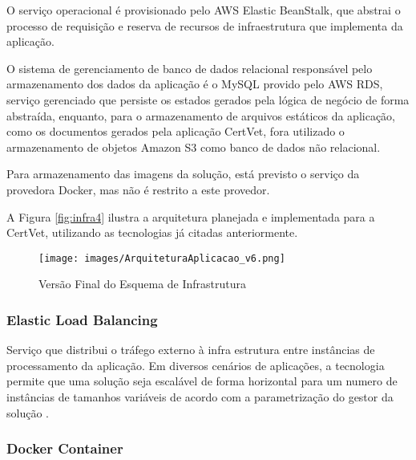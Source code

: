\documentclass[
    12pt,               %
    openright,          %
    oneside,
    a4paper,            %
    BIBLATEX,           %
    TODO,               %
    english,            %
    brazil              %
    ]{ifsp-spo-inf-ctds}
\providecommand{\DIFaddbeginFL}{} %
\providecommand{\DIFaddendFL}{} %
\providecommand{\DIFdelbeginFL}{} %
\providecommand{\DIFdelendFL}{} %
\newcommand{\DIFscaledelfig}{0.5}
\newlength{\DIFdelgraphicswidth} %
\newlength{\DIFdelgraphicsheight} %
\newcommand{\DIFaddincludegraphics}[2][]{{\color{blue}\fbox{\DIFOincludegraphics[#1]{#2}}}} %
\newcommand{\DIFdelincludegraphics}[2][]{%
\sbox{\DIFdelgraphicsbox}{\DIFOincludegraphics[#1]{#2}}%
\settoboxwidth{\DIFdelgraphicswidth}{\DIFdelgraphicsbox} %
\settoboxtotalheight{\DIFdelgraphicsheight}{\DIFdelgraphicsbox} %
\scalebox{\DIFscaledelfig}{%
\parbox[b]{\DIFdelgraphicswidth}{\usebox{\DIFdelgraphicsbox}\\[-\baselineskip] \rule{\DIFdelgraphicswidth}{0em}}\llap{\resizebox{\DIFdelgraphicswidth}{\DIFdelgraphicsheight}{%
\setlength{\unitlength}{\DIFdelgraphicswidth}%
\begin{picture}(1,1)%
\thicklines\linethickness{2pt} %
{\color[rgb]{1,0,0}\put(0,0){\framebox(1,1){}}}%
{\color[rgb]{1,0,0}\put(0,0){\line( 1,1){1}}}%
{\color[rgb]{1,0,0}\put(0,1){\line(1,-1){1}}}%
\end{picture}%
}\hspace*{3pt}}} %
} %
\DeclareRobustCommand{\DIFaddbeginFL}{\DIFOaddbeginFL \let\includegraphics\DIFaddincludegraphics} %
\DeclareRobustCommand{\DIFaddendFL}{\DIFOaddendFL \let\includegraphics\DIFOincludegraphics} %
\DeclareRobustCommand{\DIFdelbeginFL}{\DIFOdelbeginFL \let\includegraphics\DIFdelincludegraphics} %
\DeclareRobustCommand{\DIFdelendFL}{\DIFOaddendFL \let\includegraphics\DIFOincludegraphics} %
\begin{document}
        O serviço operacional é provisionado pelo AWS Elastic BeanStalk, que abstrai o processo de requisição e reserva de recursos de infraestrutura que implementa da aplicação.

        O sistema de gerenciamento de banco de dados relacional responsável pelo armazenamento dos dados da aplicação é o MySQL provido pelo AWS RDS, serviço gerenciado que persiste os estados gerados pela lógica de negócio de forma abstraída, enquanto, para o armazenamento de arquivos estáticos da aplicação, como os documentos gerados pela aplicação CertVet, fora utilizado o armazenamento de objetos Amazon S3 como banco de dados não relacional.

        Para armazenamento das imagens da solução, está previsto o serviço da provedora Docker, mas não é restrito a este provedor.

        A Figura \ref{fig:infra4} ilustra a arquitetura planejada e implementada para a CertVet, utilizando as tecnologias já citadas anteriormente.


        \begin{figure}[H]
                \centering
                \caption{Versão Final do Esquema de Infrastrutura}
                \centering
                \DIFdelbeginFL %
\DIFdelendFL \DIFaddbeginFL \texttt{[image: images/ArquiteturaAplicacao\_v6.png]}
                \label{fig:infra3}
        \DIFaddendFL \end{figure}

        \subsubsection{Elastic Load Balancing}

            Serviço que distribui o tráfego externo à infra estrutura entre instâncias de processamento da aplicação. Em diversos cenários de aplicações, a tecnologia permite que uma solução seja escalável de forma horizontal para um numero de instâncias de tamanhos variáveis de acordo com a parametrização do gestor da solução .

        \subsubsection{Docker Container}
\end{document}
